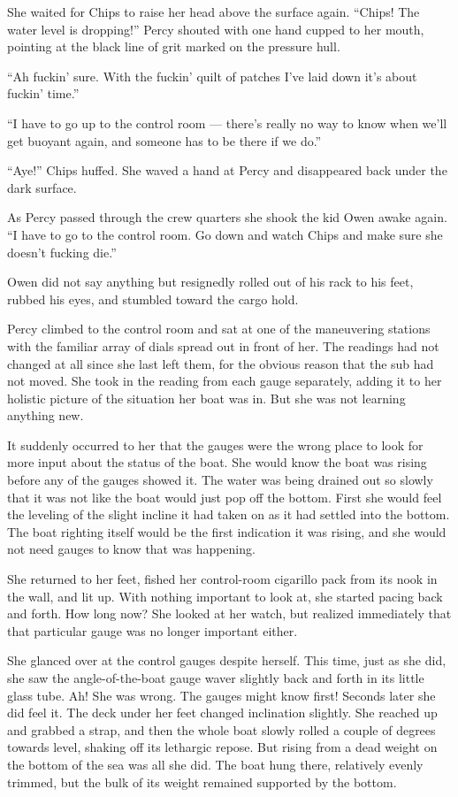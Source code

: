 \documentclass[
]{scrbook}
\begin{document}
She waited for Chips to raise her head above the surface again. ``Chips!
The water level is dropping!'' Percy shouted with one hand cupped to her
mouth, pointing at the black line of grit marked on the pressure hull.

``Ah fuckin' sure. With the fuckin' quilt of patches I've laid down it's
about fuckin' time.''

``I have to go up to the control room --- there's really no way to know
when we'll get buoyant again, and someone has to be there if we do.''

``Aye!'' Chips huffed. She waved a hand at Percy and disappeared back
under the dark surface.

\bigskip

As Percy passed through the crew quarters she shook the kid Owen awake
again. ``I have to go to the control room. Go down and watch Chips and
make sure she doesn't fucking die.''

Owen did not say anything but resignedly rolled out of his rack to his
feet, rubbed his eyes, and stumbled toward the cargo hold.

Percy climbed to the control room and sat at one of the maneuvering
stations with the familiar array of dials spread out in front of her.
The readings had not changed at all since she last left them, for the
obvious reason that the sub had not moved. She took in the reading from
each gauge separately, adding it to her holistic picture of the
situation her boat was in. But she was not learning anything new.

It suddenly occurred to her that the gauges were the wrong place to look
for more input about the status of the boat. She would know the boat was
rising before any of the gauges showed it. The water was being drained
out so slowly that it was not like the boat would just pop off the
bottom. First she would feel the leveling of the slight incline it had
taken on as it had settled into the bottom. The boat righting itself
would be the first indication it was rising, and she would not need
gauges to know that was happening.

She returned to her feet, fished her control-room cigarillo pack from
its nook in the wall, and lit up. With nothing important to look at, she
started pacing back and forth. How long now? She looked at her watch,
but realized immediately that that particular gauge was no longer
important either.

She glanced over at the control gauges despite herself. This time, just
as she did, she saw the angle-of-the-boat gauge waver slightly back and
forth in its little glass tube. Ah! She was wrong. The gauges might know
first! Seconds later she did feel it. The deck under her feet changed
inclination slightly. She reached up and grabbed a strap, and then the
whole boat slowly rolled a couple of degrees towards level, shaking off
its lethargic repose. But rising from a dead weight on the bottom of the
sea was all she did. The boat hung there, relatively evenly trimmed, but
the bulk of its weight remained supported by the bottom.
\end{document}
